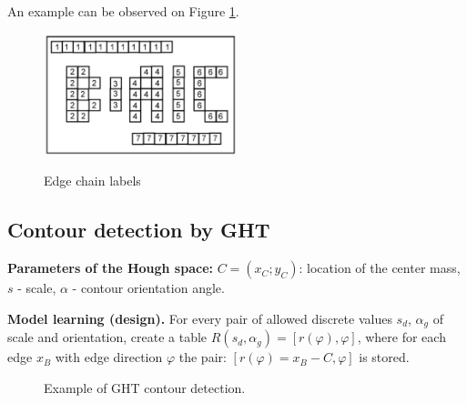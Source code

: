 \documentclass[letterpaper,12pt]{article}
\begin{document}
An example can be observed on Figure \ref{fig:edge_chain_labs}.

\begin{figure}[!th]
  \centering
  {\includegraphics[width=0.5\textwidth]{edge_chain_labs}}

    \caption{Edge chain labels  	\label{fig:edge_chain_labs}}
  \end{figure}


\subsection{Contour detection by GHT}

\textbf{Parameters of the Hough space:} $C = (x_C; y_C)$: location of the center mass, $s$ - scale, $\alpha$ - contour orientation angle.

\textbf{Model learning (design).} For every pair of allowed discrete values $s_d$, $\alpha_g$ of scale and orientation, create a table $R(s_d, \alpha_g) = [ r( \varphi ), \varphi ]$, where for each
edge $x_B$ with edge direction $\varphi$ the pair:
$[r(\varphi)=x_B - C, \varphi]$ is stored.


\begin{figure}[h]
  \centering
  \hfill
  \caption{Example of GHT contour detection.}
\end{figure}
\end{document}
